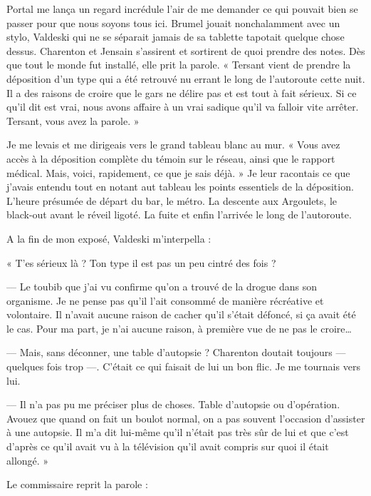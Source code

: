 Portal me lança un regard incrédule l'air de me demander ce qui pouvait bien se passer pour que nous soyons tous ici.
Brumel jouait nonchalamment avec un stylo, Valdeski qui ne se séparait jamais de sa tablette tapotait quelque chose
dessus. Charenton et Jensain s'assirent et sortirent de quoi prendre des notes. Dès que tout le monde fut installé, 
elle prit la parole. « Tersant vient de prendre la déposition d'un type qui a été retrouvé nu errant le long de 
l'autoroute cette nuit. Il a des raisons de croire que le gars ne délire pas et est tout à fait sérieux. Si ce qu'il 
dit est vrai, nous avons affaire à un vrai sadique qu'il va falloir vite arrêter. Tersant, vous avez la parole. »

Je me levais et me dirigeais vers le grand tableau blanc au mur. « Vous avez accès à la déposition complète du témoin 
sur le réseau, ainsi que le rapport médical. Mais, voici, rapidement, ce que je sais déjà.  » Je leur racontais ce que 
j'avais entendu tout en notant aut tableau les points essentiels de la déposition. L'heure présumée de départ du bar, 
le métro. La descente aux Argoulets, le black-out avant le réveil ligoté. La fuite et enfin l'arrivée le long de 
l'autoroute.

A la fin de mon exposé, Valdeski m'interpella :

« T'es sérieux là ? Ton type il est pas un peu cintré des fois ?

— Le toubib que j'ai vu confirme qu'on a trouvé de la drogue dans son organisme. Je ne pense pas qu'il l'ait consommé 
de manière récréative et volontaire. Il n'avait aucune raison de  cacher qu'il s'était défoncé, si ça avait été le cas. 
Pour ma part, je n'ai aucune raison, à première vue de ne pas le croire…

— Mais, sans déconner, une table d'autopsie ? Charenton doutait toujours — quelques fois trop —. C'était ce qui faisait 
de lui un bon flic. Je me tournais vers lui.

— Il n'a pas pu me préciser plus de choses. Table d'autopsie ou d'opération. Avouez que quand on fait un boulot 
normal, on a pas souvent l'occasion d'assister à une autopsie. Il m'a dit lui-même qu'il n'était pas très sûr de lui 
et que c'est d'après ce qu'il avait vu à la télévision qu'il avait compris sur quoi il était allongé. »

Le commissaire reprit la parole :

